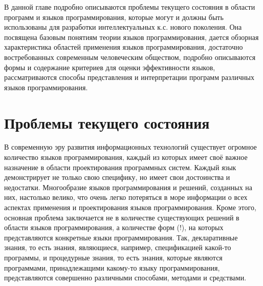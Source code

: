 В данной главе подробно описываются проблемы текущего состояния в области программ и языков программирования, которые могут и должны быть использованы для разработки интеллектуальных к.с. нового поколения. Она посвящена базовым понятиям теории языков программирования, дается обзорная характеристика областей применения языков программирования, достаточно востребованных современным человеческим обществом, подробно описываются формы и содержание критериев для оценки эффективности языков, рассматриваются способы представления и интерпретации программ различных языков программирования.

\section{Проблемы текущего состояния}

В современную эру развития информационных технологий существует огромное количество языков программирования, каждый из которых имеет своё важное назначение в области проектирования программных систем. Каждый язык демонстрирует не только свою специфику, но имеет свои достоинства и недостатки. Многообразие языков программирования \cite{Sebesta2012} и решений, созданных на них, настолько велико, что очень легко потеряться в море информации о всех аспектах применения и проектирования языков программирования. Кроме этого, основная проблема заключается не в количестве существующих решений в области языков программирования, а количестве форм (!), на которых представляются конкретные языки программирования. Так, декларативные знания, то есть знания, являющиеся, например, спецификацией какой-то программы, и процедурные знания, то есть знания, которые являются программами, принадлежащими какому-то языку программирования, представляются совершенно различными способами, методами и средствами.

